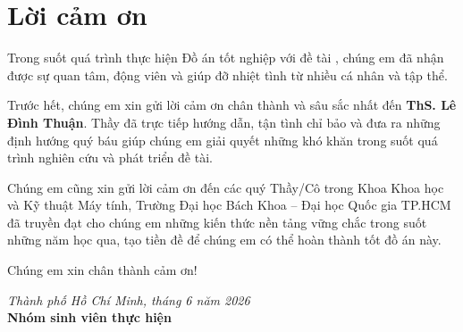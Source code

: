\section*{Lời cảm ơn}
{}
Trong suốt quá trình thực hiện Đồ án tốt nghiệp với đề tài , chúng em đã nhận được sự quan tâm, động viên và giúp đỡ nhiệt tình từ nhiều cá nhân và tập thể.

Trước hết, chúng em xin gửi lời cảm ơn chân thành và sâu sắc nhất đến \textbf{ThS. Lê Đình Thuận}. Thầy đã trực tiếp hướng dẫn, tận tình chỉ bảo và đưa ra những định hướng quý báu giúp chúng em giải quyết những khó khăn trong suốt quá trình nghiên cứu và phát triển đề tài.

Chúng em cũng xin gửi lời cảm ơn đến các quý Thầy/Cô trong Khoa Khoa học và Kỹ thuật Máy tính, Trường Đại học Bách Khoa -- Đại học Quốc gia TP.HCM đã truyền đạt cho chúng em những kiến thức nền tảng vững chắc trong suốt những năm học qua, tạo tiền đề để chúng em có thể hoàn thành tốt đồ án này.

Chúng em xin chân thành cảm ơn!
\vspace{1cm}
\begin{flushright}
\textit{Thành phố Hồ Chí Minh, tháng 6 năm 2026} \\
\textbf{Nhóm sinh viên thực hiện}
\end{flushright}
